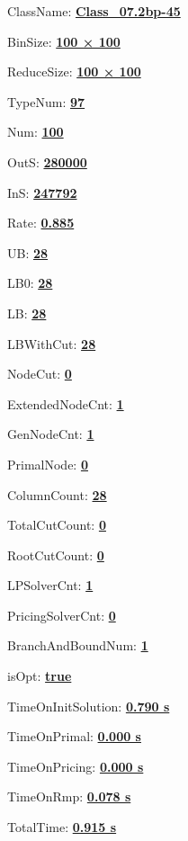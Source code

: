 \documentclass[11pt]{article}
\begin{document}
\pagestyle{empty}


ClassName: \underline{\textbf{Class_07.2bp-45}}
\par
BinSize: \underline{\textbf{100 × 100}}
\par
ReduceSize: \underline{\textbf{100 × 100}}
\par
TypeNum: \underline{\textbf{97}}
\par
Num: \underline{\textbf{100}}
\par
OutS: \underline{\textbf{280000}}
\par
InS: \underline{\textbf{247792}}
\par
Rate: \underline{\textbf{0.885}}
\par
UB: \underline{\textbf{28}}
\par
LB0: \underline{\textbf{28}}
\par
LB: \underline{\textbf{28}}
\par
LBWithCut: \underline{\textbf{28}}
\par
NodeCut: \underline{\textbf{0}}
\par
ExtendedNodeCnt: \underline{\textbf{1}}
\par
GenNodeCnt: \underline{\textbf{1}}
\par
PrimalNode: \underline{\textbf{0}}
\par
ColumnCount: \underline{\textbf{28}}
\par
TotalCutCount: \underline{\textbf{0}}
\par
RootCutCount: \underline{\textbf{0}}
\par
LPSolverCnt: \underline{\textbf{1}}
\par
PricingSolverCnt: \underline{\textbf{0}}
\par
BranchAndBoundNum: \underline{\textbf{1}}
\par
isOpt: \underline{\textbf{true}}
\par
TimeOnInitSolution: \underline{\textbf{0.790 s}}
\par
TimeOnPrimal: \underline{\textbf{0.000 s}}
\par
TimeOnPricing: \underline{\textbf{0.000 s}}
\par
TimeOnRmp: \underline{\textbf{0.078 s}}
\par
TotalTime: \underline{\textbf{0.915 s}}
\par
\newpage


\end{document}

